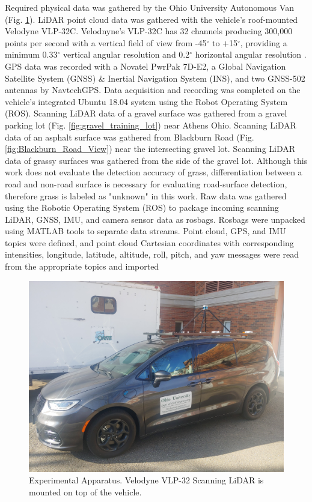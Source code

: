 \documentclass[journal,onecolumn]{IEEEtran}
\begin{document}
			{Required physical data was gathered by the Ohio University Autonomous Van (Fig. \ref{fig:Experimental_Apperatus}). LiDAR point cloud data was gathered with the vehicle's roof-mounted Velodyne VLP-32C. Velodnyne's VLP-32C has 32 channels producing 300,000 points per second with a vertical field of view from -45$^{\circ}$ to $+$15$^{\circ}$, providing a minimum 0.33$^{\circ}$ vertical angular resolution and 0.2$^{\circ}$ horizontal angular resolution \cite{vlp_32c}. GPS data was recorded with a Novatel PwrPak 7D-E2, a Global Navigation Satellite System (GNSS) \& Inertial Navigation System (INS), and two GNSS-502 antennas by NavtechGPS. Data acquisition and recording was completed on the vehicle's integrated Ubuntu 18.04 system using the Robot Operating System (ROS). Scanning LiDAR data of a gravel surface was gathered from a gravel parking lot (Fig. \ref{fig:gravel_training_lot}) near Athens Ohio. Scanning LiDAR data of an asphalt surface was gathered from Blackburn Road (Fig. \ref{fig:Blackburn_Road_View}) near the intersecting gravel lot. Scanning LiDAR data of grassy surfaces was gathered from the side of the gravel lot. Although this work does not evaluate the detection accuracy of grass, differentiation between a road and non-road surface is necessary for evaluating road-surface detection, therefore grass is labeled as "unknown" in this work. Raw data was gathered using the Robotic Operating System (ROS) to package incoming scanning LiDAR, GNSS, IMU, and camera sensor data as rosbags. Rosbags were unpacked using MATLAB tools to separate data streams. Point cloud, GPS, and IMU topics were defined, and point cloud Cartesian coordinates with corresponding intensities, longitude, latitude, altitude, roll, pitch, and yaw messages were read from the appropriate topics and imported}
	
			\begin{figure}[H]
				\centering
				\includegraphics[width=0.75\linewidth]{figures/van_on_van}
				\caption[Experimental Apparatus]{Experimental Apparatus. Velodyne VLP-32 Scanning LiDAR is mounted on top of the vehicle.}
				\label{fig:Experimental_Apperatus}
			\end{figure}
		
\end{document}
